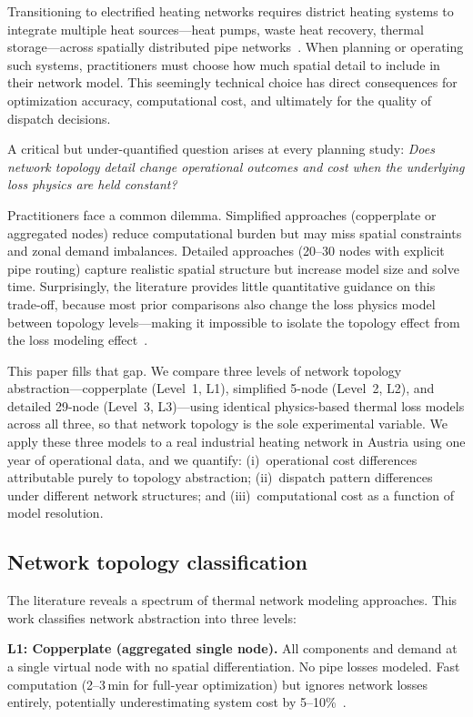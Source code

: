 \documentclass[a4paper,fleqn]{cas-dc}
\begin{document}
Transitioning to electrified heating networks requires district heating systems to integrate multiple heat sources---heat pumps, waste heat recovery, thermal storage---across spatially distributed pipe networks~\citep{Werner2017,Paardekooper2018}. When planning or operating such systems, practitioners must choose how much spatial detail to include in their network model. This seemingly technical choice has direct consequences for optimization accuracy, computational cost, and ultimately for the quality of dispatch decisions.

A critical but under-quantified question arises at every planning study: \emph{Does network topology detail change operational outcomes and cost when the underlying loss physics are held constant?}

Practitioners face a common dilemma. Simplified approaches (copperplate or aggregated nodes) reduce computational burden but may miss spatial constraints and zonal demand imbalances. Detailed approaches (20--30 nodes with explicit pipe routing) capture realistic spatial structure but increase model size and solve time. Surprisingly, the literature provides little quantitative guidance on this trade-off, because most prior comparisons also change the loss physics model between topology levels---making it impossible to isolate the topology effect from the loss modeling effect~\citep{vanderHeijde2017,Li2013}.

This paper fills that gap. We compare three levels of network topology abstraction---copperplate (Level~1, L1), simplified 5-node (Level~2, L2), and detailed 29-node (Level~3, L3)---using identical physics-based thermal loss models across all three, so that network topology is the sole experimental variable. We apply these three models to a real industrial heating network in Austria using one year of operational data, and we quantify: (i)~operational cost differences attributable purely to topology abstraction; (ii)~dispatch pattern differences under different network structures; and (iii)~computational cost as a function of model resolution.

\subsection{Network topology classification}

The literature reveals a spectrum of thermal network modeling approaches. This work classifies network abstraction into three levels:

\textbf{L1: Copperplate (aggregated single node).} All components and demand at a single virtual node with no spatial differentiation. No pipe losses modeled. Fast computation (2--3\,min for full-year optimization) but ignores network losses entirely, potentially underestimating system cost by 5--10\%~\citep{Leitner2018}.
\end{document}
